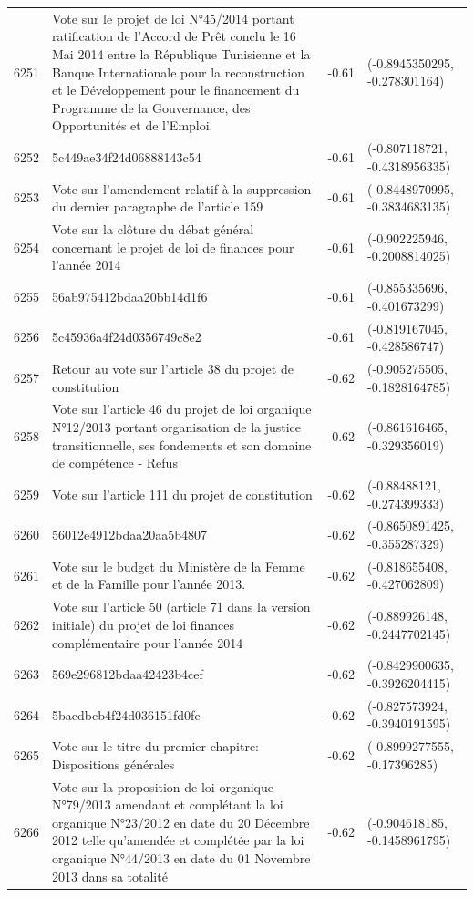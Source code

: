 \begin{table}[ht]
\begin{tabular}{rlrl}
  6251 & Vote sur le projet de loi N°45/2014 portant ratification de l’Accord de Prêt conclu le 16 Mai 2014 entre la République Tunisienne et la Banque Internationale pour la reconstruction et le Développement pour le financement du Programme de la Gouvernance, des Opportunités et de l’Emploi. & -0.61 & (-0.8945350295, -0.278301164) \\ 
  6252 & 5c449ae34f24d06888143c54 & -0.61 & (-0.807118721, -0.4318956335) \\ 
  6253 & Vote sur l'amendement relatif à la suppression du dernier paragraphe de l'article 159 & -0.61 & (-0.8448970995, -0.3834683135) \\ 
  6254 & Vote sur la clôture du débat général concernant le projet de loi de finances pour l'année 2014 & -0.61 & (-0.902225946, -0.2008814025) \\ 
  6255 & 56ab975412bdaa20bb14d1f6 & -0.61 & (-0.855335696, -0.401673299) \\ 
  6256 & 5c45936a4f24d0356749c8e2 & -0.61 & (-0.819167045, -0.428586747) \\ 
  6257 & Retour au vote sur l'article 38 du projet de constitution & -0.62 & (-0.905275505, -0.1828164785) \\ 
  6258 & Vote sur l'article 46 du projet de loi organique N°12/2013 portant organisation de la justice transitionnelle, ses fondements et son domaine de compétence - Refus & -0.62 & (-0.861616465, -0.329356019) \\ 
  6259 & Vote sur l'article 111 du projet de constitution & -0.62 & (-0.88488121, -0.274399333) \\ 
  6260 & 56012e4912bdaa20aa5b4807 & -0.62 & (-0.8650891425, -0.355287329) \\ 
  6261 & Vote sur le budget du Ministère de la Femme et de la Famille pour l'année 2013. & -0.62 & (-0.818655408, -0.427062809) \\ 
  6262 & Vote sur l'article 50 (article 71 dans la version initiale) du projet de loi finances complémentaire pour l'année 2014 & -0.62 & (-0.889926148, -0.2447702145) \\ 
  6263 & 569e296812bdaa42423b4cef & -0.62 & (-0.8429900635, -0.3926204415) \\ 
  6264 & 5bacdbcb4f24d036151fd0fe & -0.62 & (-0.827573924, -0.3940191595) \\ 
  6265 & Vote sur le titre du premier chapitre: Dispositions générales & -0.62 & (-0.8999277555, -0.17396285) \\ 
  6266 & Vote sur la proposition de loi organique N°79/2013 amendant et complétant la loi organique N°23/2012 en date du 20 Décembre 2012 telle qu'amendée et complétée par la loi organique N°44/2013 en date du 01 Novembre 2013 dans sa totalité & -0.62 & (-0.904618185, -0.1458961795) \\ 

\end{tabular}
\end{table}
